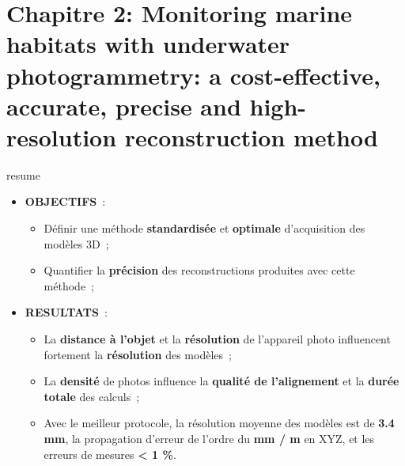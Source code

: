 \chapter[Monitoring marine habitats with underwater photogrammetry: a cost-effective, accurate, precise and high-resolution reconstruction method]{Chapitre 2: Monitoring marine habitats with underwater photogrammetry: a cost-effective, accurate, precise and high-resolution reconstruction method} \label{chapitre2-methode}

\pagestyle{main}

\begin{center}
\end{center}


\begin{center}
\begin{colbox}{resume}
  \vspace{-2pt}
{\color{textresume}\small
\begin{itemize}[leftmargin=0in]\itemsep3pt
\item \textbf{OBJECTIFS}~:
    \begin{itemize}
      \item Définir une méthode \textbf{standardisée} et \textbf{optimale} d'acquisition des modèles 3D~;
      \item Quantifier la \textbf{précision} des reconstructions produites avec cette méthode~;
    \end{itemize}
\item \textbf{RESULTATS}~:
    \begin{itemize}
      \item La \textbf{distance à l'objet} et la \textbf{résolution} de l'appareil photo influencent fortement la \textbf{résolution} des modèles~;
      \item La \textbf{densité} de photos influence la \textbf{qualité de l'alignement} et la \textbf{durée totale} des calculs~;
      \item Avec le meilleur protocole, la résolution moyenne des modèles est de \textbf{3.4 mm}, la propagation d'erreur de l'ordre du \textbf{mm / m} en XYZ, et les erreurs de mesures \textbf{< 1 \%}.
    \end{itemize}
\end{itemize}
}
\vspace{-2pt}
\end{colbox}
\end{center}

